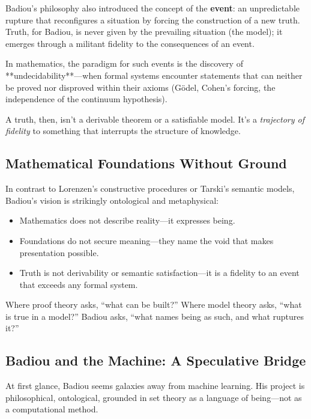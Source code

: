 Badiou’s philosophy also introduced the concept of the \textbf{event}: an unpredictable rupture that reconfigures a situation by forcing the construction of a new truth. Truth, for Badiou, is never given by the prevailing situation (the model); it emerges through a militant fidelity to the consequences of an event.

In mathematics, the paradigm for such events is the discovery of **undecidability**—when formal systems encounter statements that can neither be proved nor disproved within their axioms (Gödel, Cohen’s forcing, the independence of the continuum hypothesis).

A truth, then, isn’t a derivable theorem or a satisfiable model. It’s a \emph{trajectory of fidelity} to something that interrupts the structure of knowledge.

\vspace{1em}

\subsection{Mathematical Foundations Without Ground}

In contrast to Lorenzen’s constructive procedures or Tarski’s semantic models, Badiou’s vision is strikingly ontological and metaphysical:

\begin{itemize}
  \item Mathematics does not describe reality—it expresses being.
  \item Foundations do not secure meaning—they name the void that makes presentation possible.
  \item Truth is not derivability or semantic satisfaction—it is a fidelity to an event that exceeds any formal system.
\end{itemize}

Where proof theory asks, “what can be built?”  
Where model theory asks, “what is true in a model?”  
Badiou asks, “what names being as such, and what ruptures it?”

\vspace{1em}

\subsection{Badiou and the Machine: A Speculative Bridge}

At first glance, Badiou seems galaxies away from machine learning. His project is philosophical, ontological, grounded in set theory as a language of being—not as a computational method.

